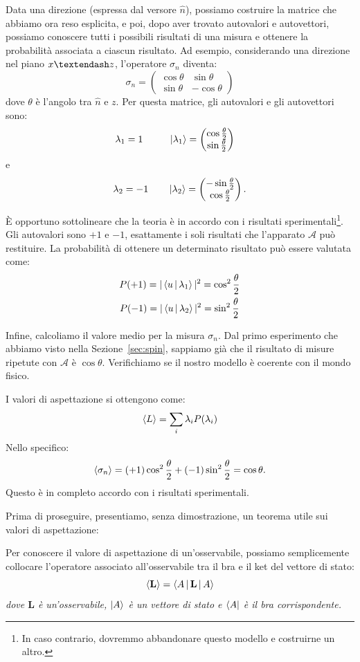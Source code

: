 Data una direzione (espressa dal versore $\hat{n}$), possiamo costruire la matrice che abbiamo ora reso esplicita, e poi, dopo aver trovato autovalori e autovettori, possiamo conoscere tutti i possibili risultati di una misura e ottenere la probabilità associata a ciascun risultato. Ad esempio, considerando una direzione nel piano $x\textendash z$, l'operatore $\sigma_n$ diventa:
\[
\sigma_n = 
\begin{pmatrix}
	\cos\theta & \sin\theta\\
	\sin\theta & -\cos\theta
\end{pmatrix} 	
\]
dove $\theta$ è l'angolo tra $\hat{n}$ e $z$. Per questa matrice, gli autovalori e gli autovettori sono:
\[
\lambda_1 = 1 \quad\quad\ \  \Ket{\lambda_1}=
\begin{pmatrix}
	\cos\frac{\theta}{2}\\
	\sin\frac{\theta}{2}
\end{pmatrix} \quad
\]
e
\[
\lambda_2 = -1 \quad\quad \Ket{\lambda_2}=
\begin{pmatrix}
	-\sin\frac{\theta}{2}\\
	\cos\frac{\theta}{2}
\end{pmatrix}.
\]

È opportuno sottolineare che la teoria è in accordo con i risultati sperimentali\footnote{In caso contrario, dovremmo abbandonare questo modello e costruirne un altro.}. Gli autovalori sono $+1$ e $-1$, esattamente i soli risultati che l'apparato $\mathcal{A}$ può restituire. La probabilità di ottenere un determinato risultato può essere valutata come:
\begin{gather*}
	P(+1) = |\Braket{u|\lambda_1}|^2 = \cos^2\frac{\theta}{2}\\
	P(-1) = |\Braket{u|\lambda_2}|^2 = \sin^2\frac{\theta}{2}
\end{gather*}

Infine, calcoliamo il valore medio per la misura $\sigma_n$. Dal primo esperimento che abbiamo visto nella Sezione~\ref{sec:spin}, sappiamo già che il risultato di misure ripetute con $\mathcal{A}$ è $\cos\theta$. Verifichiamo se il nostro modello è coerente con il mondo fisico.

I valori di aspettazione si ottengono come:
\[
\Braket{L} = \sum_{i}\lambda_iP(\lambda_i)
\]
Nello specifico:
\[
\Braket{\sigma_n} = (+1)\cos^2\frac{\theta}{2} + (-1)\sin^2\frac{\theta}{2} = \cos\theta.
\]
Questo è in completo accordo con i risultati sperimentali.

Prima di proseguire, presentiamo, senza dimostrazione, un teorema utile sui valori di aspettazione:
\begin{theorem}
	Per conoscere il valore di aspettazione di un'osservabile, possiamo semplicemente collocare l'operatore associato all'osservabile tra il bra e il ket del vettore di stato:
	\begin{equation}
		\label{eqn:exp}
		\Braket{\mathbf{L}} = \Braket{A|\mathbf{L}|A}
	\end{equation}
	\emph{dove $\mathbf{L}$ è un'osservabile, $\Ket{A}$ è un vettore di stato e $\Bra{A}$ è il bra corrispondente.}
\end{theorem}

